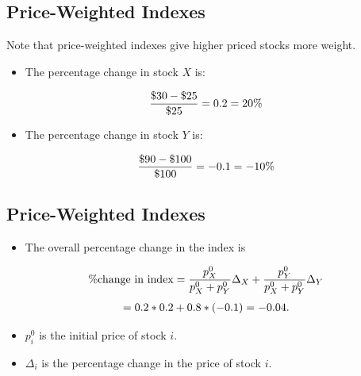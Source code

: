 \documentclass[letterpaper,10pt,english]{sphinxmanual}
\begin{document}
\subsection{Price-Weighted Indexes}
\label{indexes:id2}
Note that price-weighted indexes give higher priced stocks more
weight.
\begin{itemize}
\item {} 
The percentage change in stock $X$ is:

\end{itemize}
\begin{gather}
\begin{split}\frac{\$30 - \$25}{\$25} = 0.2 = 20\%\end{split}\notag
\end{gather}\begin{itemize}
\item {} 
The percentage change in stock $Y$ is:

\end{itemize}
\begin{gather}
\begin{split}\frac{\$90 - \$100}{\$100} = -0.1 = -10\%\end{split}\notag
\end{gather}

\subsection{Price-Weighted Indexes}
\label{indexes:id3}\begin{itemize}
\item {} 
The overall percentage change in the index is

\end{itemize}
\begin{gather}
\begin{split}\% \text{change in index} = \frac{p^0_X}{p^0_X+p^0_Y} \Delta_X +
 \frac{p^0_Y}{p^0_X+p^0_Y} \Delta_Y\end{split}\notag
\end{gather}\begin{gather}
\begin{split}= 0.2 * 0.2 + 0.8 * (-0.1) = -0.04.\end{split}\notag
\end{gather}\begin{itemize}
\item {} 
$p^0_i$ is the initial price of stock $i$.

\end{itemize}
\begin{itemize}
\item {} 
$\Delta_i$ is the percentage change in the price of stock $i$.

\end{itemize}
\end{document}
